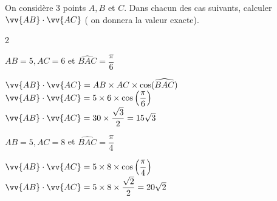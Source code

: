 \documentclass[12pt,a4paper]{article}  %
\begin{document}
\graphicspath{{../images/}}

\begin{center}

\end{center}



%

\vspace{-.3cm} 
On considère 3 points $A, B$ et $C$. Dans chacun des cas suivants, calculer $\vv{A B} \cdot \vv{A C}$ ( on donnera la valeur exacte).
\begin{multicols}{2}
\begin{enumMet}
    \item $A B=5, A C=6$ et $\widehat{BAC}=\dfrac{\pi}{6}$
     \begin{corrBox}
    	$\vv{A B} \cdot \vv{A C}=A B \times A C \times \cos (\widehat{B A C})$\\
    	$\vv{A B} \cdot \vv{AC}=5 \times 6 \times \cos \left(\dfrac{\pi}{6}\right)$\\
    	$\vv{A B} \cdot \vv{AC}=30 \times \dfrac{\sqrt{3}}{2}=15\sqrt{3}$
    \end{corrBox}
    \item {} $A B=5, A C=8$ et $\widehat{BAC}=\dfrac{\pi}{4}$
    \begin{corrBox}
    	$\vv{A B} \cdot \vv{A C}=5 \times 8 \times \cos \left(\dfrac{\pi}{4}\right)$\\
    	$\vv{A B} \cdot \vv{A C}=5 \times 8 \times \dfrac{\sqrt{2}}{2}=20 \sqrt{2}$
    \end{corrBox}
\end{enumMet}
\end{multicols}
\end{document}
